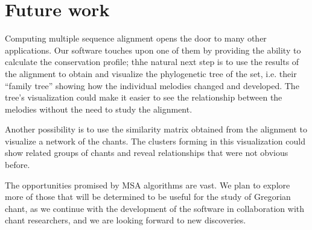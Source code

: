 \section*{Future work}

Computing multiple sequence alignment opens the door to many other applications. Our software touches upon one
of them by providing the ability to calculate the conservation profile; thhe natural next step is to use the results of the alignment to
obtain and visualize the phylogenetic tree of the set, i.e. their
``family tree'' showing how the individual melodies changed and developed. The tree's visualization could make it easier to see
the relationship between the melodies without the need to study the alignment.

Another possibility is to use the similarity matrix obtained from the alignment to visualize a network of the chants. The clusters
forming in this visualization could show related groups of chants and reveal relationships that were not obvious before.

The opportunities promised by MSA algorithms are vast. We plan to explore more of those that will be determined to be useful for the study of Gregorian
chant, as we continue with the development of the software in collaboration with chant researchers, and we are looking forward to new discoveries.
